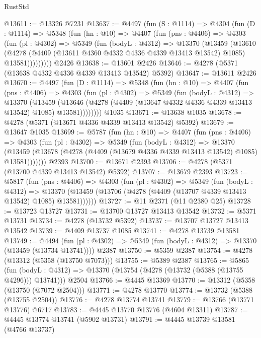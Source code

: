 \begin{lexlean}{RustStd}
\begin{coremodule}
{\begin{coremodule}
{{{{{{{{{{{{{{{{{{{{{{{{{{{{{{{{{{{@13611 := @13326 @7231
@13637 := @4497
    (fun (S : @1114) =>
    @4304
      (fun (D : @1114) =>
      @5348
        (fun (hn : @10) =>
        @4407
          (fun (pns : @4406) =>
          @4303
            (fun (pl : @4302) =>
            @5349
              (fun (bodyL : @4312) =>
              @13370
                (@13459
                  (@13610
                    (@4278
                      (@4409 (@13611 @4360 @4332 @4336 @4339 @13413 @13542) @1085)
                      @13581)))))))))
    @2426
@13638 := @13601 @2426
@13646 := @4278 (@5371 (@13638 @4332 @4336 @4339 @13413 @13542) @5392)
@13647 := @13611 @2426
@13670 := @4497
    (fun (D : @1114) =>
    @5348
      (fun (hn : @10) =>
      @4407
        (fun (pns : @4406) =>
        @4303
          (fun (pl : @4302) =>
          @5349
            (fun (bodyL : @4312) =>
            @13370
              (@13459
                (@13646 (@4278 (@4409 (@13647 @4332 @4336 @4339 @13413 @13542) @1085) @13581))))))))
    @1035
@13671 := @13638 @1035
@13678 := @4278 (@5371 (@13671 @4336 @4339 @13413 @13542) @5392)
@13679 := @13647 @1035
@13699 := @5787
    (fun (hn : @10) =>
    @4407
      (fun (pns : @4406) =>
      @4303
        (fun (pl : @4302) =>
        @5349
          (fun (bodyL : @4312) =>
          @13370
            (@13459 (@13678 (@4278 (@4409 (@13679 @4336 @4339 @13413 @13542) @1085) @13581)))))))
    @2393
@13700 := @13671 @2393
@13706 := @4278 (@5371 (@13700 @4339 @13413 @13542) @5392)
@13707 := @13679 @2393
@13723 := @5817
    (fun (pns : @4406) =>
    @4303
      (fun (pl : @4302) =>
      @5349
        (fun (bodyL : @4312) =>
        @13370 (@13459 (@13706 (@4278 (@4409 (@13707 @4339 @13413 @13542) @1085) @13581))))))
@13727 := @11 @2371 (@11 @2380 @25)
@13728 := @13723 @13727
@13731 := @13700 @13727 @13413 @13542
@13732 := @5371 @13731
@13734 := @4278 (@13732 @5392)
@13737 := @13707 @13727 @13413 @13542
@13739 := @4409 @13737 @1085
@13741 := @4278 @13739 @13581
@13749 := @4494
    (fun (pl : @4302) => @5349 (fun (bodyL : @4312) => @13370 (@13459 (@13734 @13741))))
    @2387
@13750 := @5359 @2387
@13754 := @4278 (@13312 (@5358 (@13750 @7073)))
@13755 := @5389 @2387
@13765 := @5865
    (fun (bodyL : @4312) => @13370 (@13754 (@4278 (@13732 (@5388 (@13755 @4296))) @13741)))
    @2504
@13766 := @4445 @13369
@13770 := @13312 (@5358 (@13750 (@7072 @2504)))
@13771 := @4278 @13770
@13774 := @13732 (@5388 (@13755 @2504))
@13776 := @4278 @13774 @13741
@13779 := @13766 (@13771 @13776) @6717
@13783 := @4445 @13770 @13776 (@4604 @13311)
@13787 := @4445 @13774 @13741 (@5902 @13731)
@13791 := @4445 @13739 @13581 (@4766 @13737)
}}}}}}}}}}}}}}}}}}}}}}}}}}}}}}}}}}}
\end{coremodule}}
\end{coremodule}
\end{lexlean}
